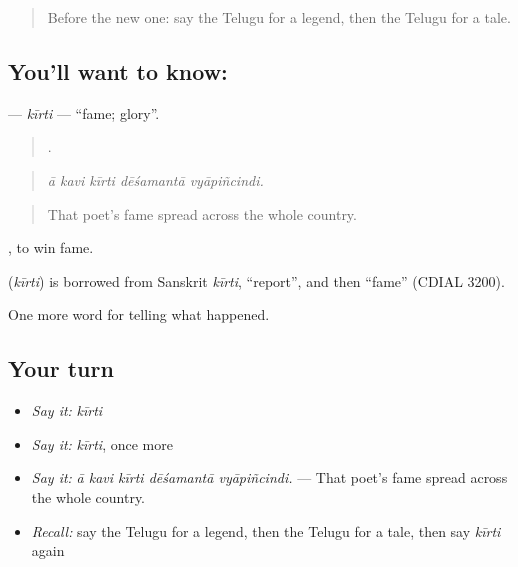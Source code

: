 \label{lesson:TE-C370-kirti}



\begin{quote}
Before the new one: say the Telugu for a legend, then the Telugu for a tale.
\end{quote}

\subsection*{You'll want to know: }
\textbf{} — \emph{kīrti} — \textquotedblleft{}fame; glory\textquotedblright{}.

\begin{quote}
    .
\end{quote}

\begin{quote}
\emph{ā kavi kīrti dēśamantā vyāpiñcindi.}
\end{quote}

\begin{quote}
That poet's fame spread across the whole country.
\end{quote}

 , to win fame.

\begin{cousinweb}
\textbf{} (\emph{kīrti}) is borrowed from Sanskrit \emph{kīrti}, \textquotedblleft{}report\textquotedblright{}, and then \textquotedblleft{}fame\textquotedblright{} (CDIAL 3200).
\end{cousinweb}

\begin{grammarlens}[title={What you've built}]
One more word for telling what happened.
\end{grammarlens}

\subsection*{Your turn}
\begin{itemize}
\raggedright
  \item \emph{Say it:} \emph{kīrti}
  \item \emph{Say it:} \emph{kīrti}, once more
  \item \emph{Say it:} \emph{ā kavi kīrti dēśamantā vyāpiñcindi.} — That poet's fame spread across the whole country.
  \item \emph{Recall:} say the Telugu for a legend, then the Telugu for a tale, then say \emph{kīrti} again
\end{itemize}

